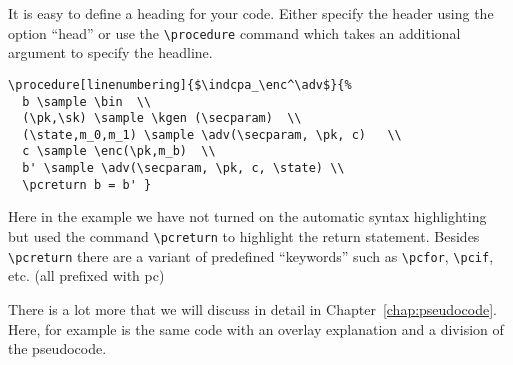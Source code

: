 \documentclass[a4paper]{report}
\begin{document}
It is easy to define a heading for your code. Either specify the header using the option \enquote{head} or use
the \lstinline$\procedure$ command which takes an additional argument to specify the headline.
\begin{center}
\end{center}

\begin{lstlisting}
\procedure[linenumbering]{$\indcpa_\enc^\adv$}{%
  b \sample \bin  \\
  (\pk,\sk) \sample \kgen (\secparam)  \\
  (\state,m_0,m_1) \sample \adv(\secparam, \pk, c)   \\
  c \sample \enc(\pk,m_b)  \\
  b' \sample \adv(\secparam, \pk, c, \state) \\
  \pcreturn b = b' }
\end{lstlisting}
Here in the example we have not turned on the automatic syntax highlighting but used the command \lstinline$\pcreturn$
to highlight the return statement. Besides \lstinline$\pcreturn$ there are a variant of predefined \enquote{keywords}
such as \lstinline$\pcfor$, \lstinline$\pcif$, etc. (all prefixed with pc)

There is a lot more that we will discuss in detail in Chapter~\ref{chap:pseudocode}. Here, for example
is the same code with an overlay explanation and a division of the pseudocode.
\begin{center}
\end{center}
\end{document}
